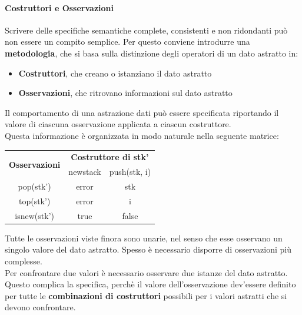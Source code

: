 \documentclass{article}
\begin{document}
	\paragraph*{Costruttori e Osservazioni}
	Scrivere delle specifiche semantiche complete, consistenti e non ridondanti può non essere un compito semplice. Per questo conviene introdurre una \textbf{metodologia}, che si basa sulla distinzione degli operatori di un dato astratto in:
	\begin{itemize}
		\item \textbf{Costruttori}, che creano o istanziano il dato astratto
		\item \textbf{Osservazioni}, che ritrovano informazioni sul dato astratto
	\end{itemize}
	Il comportamento di una astrazione dati può essere specificata riportando il valore di ciascuna osservazione applicata a ciascun costruttore. \\
	Questa informazione è organizzata in modo naturale nella seguente matrice:
	\begin{center}
		\begin{tabular}{|c|cc|}
		\hline
		\multirow{2}{*}{\textbf{Osservazioni}} & \multicolumn{2}{c|}{\textbf{Costruttore di stk'}} \\ \cline{2-3} 
											   & \multicolumn{1}{c|}{newstack}    & push(stk, i)   \\ \hline
		pop(stk')                              & \multicolumn{1}{c|}{error}       & stk            \\ \hline
		top(stk')                              & \multicolumn{1}{c|}{error}       & i              \\ \hline
		isnew(stk')                            & \multicolumn{1}{c|}{true}        & false          \\ \hline
		\end{tabular}
	\end{center}
	Tutte le osservazioni viste finora sono unarie, nel senso che esse osservano un singolo valore del dato astratto. Spesso è necessario disporre di osservazioni più complesse. \\
	Per confrontare due valori è necessario osservare due istanze del dato astratto. Questo complica la specifica, perchè il valore dell'osservazione dev'essere definito per tutte le \textbf{combinazioni di costruttori} possibili per i valori astratti che si devono confrontare. \\
	\vspace*{\baselineskip}	\\
\end{document}
